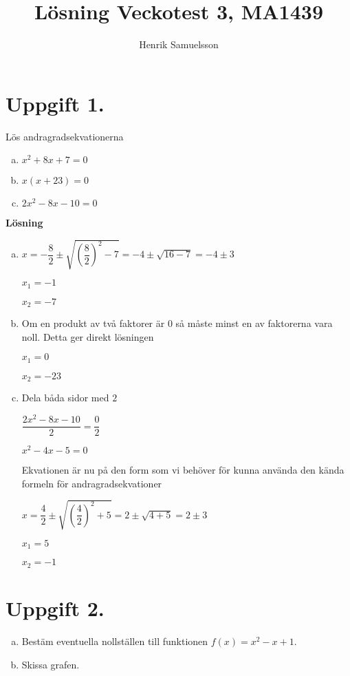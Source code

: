 \documentclass{article}
\begin{document}
\begin{titlepage}
\title{Lösning Veckotest 3, MA1439}
\author{Henrik Samuelsson}
\maketitle
\thispagestyle{empty}
\end{titlepage}

\section*{Uppgift 1.}
Lös andragradsekvationerna
\begin{enumerate}[(a)]
\item $x^2+8x+7=0$
\item $x(x+23)=0$
\item $2x^2-8x-10=0$
\end{enumerate}

\textbf{Lösning}
\begin{enumerate}[(a)]
\item
$x=-\dfrac{8}{2}\pm\sqrt{\left(\dfrac{8}{2}\right)^2-7}=-4\pm\sqrt{16-7}=-4\pm3$

$x_1 = -1$

$x_2 = -7$

\item
Om en produkt av två faktorer är $0$ så måste minst en av faktorerna vara noll. Detta ger direkt lösningen

$x_1 = 0$

$x_2 = -23$

\item
Dela båda sidor med $2$

$\dfrac{2x^2-8x-10}{2}=\dfrac{0}{2}$

$x^2-4x-5 = 0$

Ekvationen är nu på den form som vi behöver för kunna använda den kända formeln för andragradsekvationer

$x=\dfrac{4}{2}\pm\sqrt{\left(\dfrac{4}{2}\right)^2+5}=2\pm\sqrt{4+5}=2\pm3$

$x_1 = 5$

$x_2 = -1$
\end{enumerate}

\section*{Uppgift 2.}
\begin{enumerate}[(a)]
\item Bestäm eventuella nollställen till funktionen $f(x)=x^2-x+1$.
\item Skissa grafen.
\end{enumerate}
\end{document}
